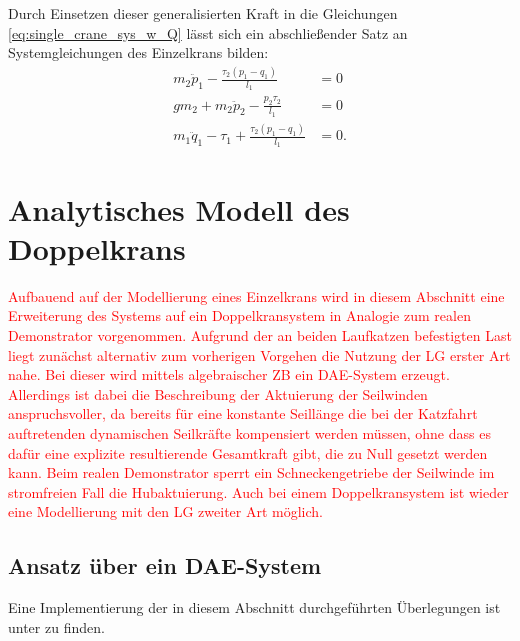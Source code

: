 Durch Einsetzen dieser generalisierten Kraft in die Gleichungen \eqref{eq:single_crane_sys_w_Q} lässt sich ein abschließender Satz an Systemgleichungen des Einzelkrans bilden:
\begin{subequations}
	\begin{align}
		m_{2} \ddot{p}_{1} - \frac{\tau_{2} \left(p_{1} - q_{1}\right)}{l_{1}} &= 0 \label{single_flat_syseq1}\\
		g m_{2} + m_{2} \ddot{p}_{2} - \frac{p_{2} \tau_{2}}{l_{1}} &= 0\label{single_flat_syseq2}\\
		m_{1} \ddot{q}_{1} - \tau_{1} + \frac{\tau_{2} \left(p_{1} - q_{1}\right)}{l_{1}} &= 0\label{single_flat_syseq3}.
	\end{align}
\end{subequations}


\section{Analytisches Modell des Doppelkrans}
\textcolor{red}{Aufbauend auf der Modellierung eines Einzelkrans wird in diesem Abschnitt eine Erweiterung des Systems auf ein Doppelkransystem in Analogie zum realen Demonstrator vorgenommen. Aufgrund der an beiden Laufkatzen befestigten Last liegt zunächst alternativ zum vorherigen Vorgehen die Nutzung der LG erster Art nahe. Bei dieser wird mittels algebraischer ZB ein DAE-System erzeugt. Allerdings ist dabei die Beschreibung der Aktuierung der Seilwinden anspruchsvoller, da bereits für eine konstante Seillänge die bei der Katzfahrt auftretenden dynamischen Seilkräfte kompensiert werden müssen, ohne dass es dafür eine explizite resultierende Gesamtkraft gibt, die zu Null gesetzt werden kann. Beim realen Demonstrator sperrt ein Schneckengetriebe der Seilwinde im stromfreien Fall die Hubaktuierung. Auch bei einem Doppelkransystem ist wieder eine Modellierung mit den LG zweiter Art möglich.}

\subsection{Ansatz über ein DAE-System}
Eine Implementierung der in diesem Abschnitt durchgeführten Überlegungen ist unter \cite[double\_crane\_notebooks/DAE\_double\_crane\_cartesian.ipynb]{SAGithub} zu finden.

